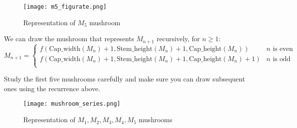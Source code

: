 \documentclass[addpoints]{exam}
\begin{document}
\begin{questions}
\begin{figure}[h]
  \centering
  \texttt{[image: m5\_figurate.png]}
  \caption{Representation of $M_5$ mushroom}
  \label{fig:mushroom_anatomy}
\end{figure}

We can draw the mushroom that represents $M_{n+1}$ recursively, for $n \geq 1$:
\[ 
    M_{n+1}=
    \begin{cases} 
      f(\textrm{Cap\_width}(M_n) + 1, \textrm{Stem\_height}(M_n) + 1, \textrm{Cap\_height}(M_n))  & n \textrm{ is even} \\
      f(\textrm{Cap\_width}(M_n) + 1, \textrm{Stem\_height}(M_n) + 1, \textrm{Cap\_height}(M_n)+1) & n \textrm{ is odd}  \\      
   \end{cases}
\]

Study the first five mushrooms carefully and make sure you can draw subsequent ones using the recurrence above.

\begin{figure}[h]
  \centering
  \texttt{[image: mushroom\_series.png]}
  \caption{Representation of $M_1,M_2,M_3,M_4,M_5$ mushrooms}
  \label{fig:mushroom_anatomy}
\end{figure}

\end{questions}
\end{document}
